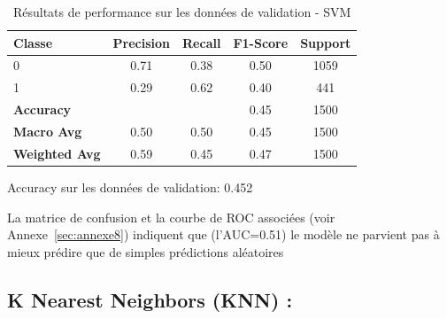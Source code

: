 \begin{table}[h]
\centering
\caption{Résultats de performance sur les données de validation - SVM}
\label{tab:performance_validation_SVM}
\begin{tabular}{|l|c|c|c|c|}
\hline
\textbf{Classe}       & \textbf{Precision} & \textbf{Recall} & \textbf{F1-Score} & \textbf{Support} \\ \hline
0                     & 0.71               & 0.38            & 0.50              & 1059             \\ \hline
1                     & 0.29               & 0.62            & 0.40              & 441              \\ \hline
\textbf{Accuracy} & \multicolumn{2}{|c|}{} & 0.45       & 1500     \\ \hline
\textbf{Macro Avg}    & 0.50               & 0.50            & 0.45              & 1500             \\ \hline
\textbf{Weighted Avg} & 0.59               & 0.45            & 0.47              & 1500             \\ \hline
\end{tabular}
\begin{flushleft}
Accuracy sur les données de validation: 0.452
\end{flushleft}
\end{table}


\begin{flushleft}
La matrice de confusion et la courbe de ROC associées (voir Annexe~\ref{sec:annexe8}) indiquent que (l'AUC=0.51) le modèle ne parvient pas à mieux prédire que de simples prédictions aléatoires
\end{flushleft}
 
\subsection{K Nearest Neighbors (KNN) :}

